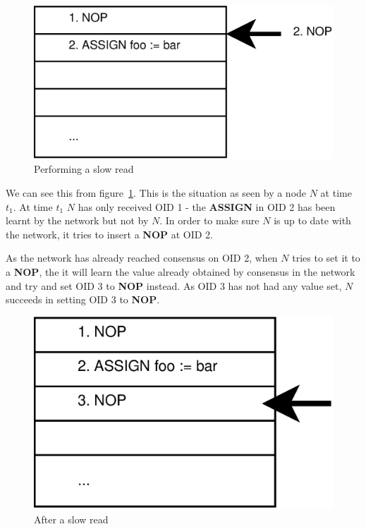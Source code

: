 \documentclass[12pt,twoside,notitlepage]{report}
\newcommand{\op}[1]  {{\bf #1}}         %
\begin{document}
\begin{figure}[htb]
\centering
\includegraphics[scale=0.5]{figs/op-log-slow-read-1.eps}
\caption{\label{fig:op-log-slow-read-1}Performing a slow read}
\end{figure}

We can see this from figure~\ref{fig:op-log-slow-read-1}. This is the situation as seen by a node
$N$ at time $t_1$. At time $t_1$ $N$ has only received OID 1 - the \op{ASSIGN} in OID 2 has been
learnt by the network but not by $N$. In order to make sure $N$ is up to date with the network, it
tries to insert a \op{NOP} at OID 2.

As the network has already reached consensus on OID 2, when $N$ tries to set it to a \op{NOP}, the
it will learn the value already obtained by consensus in the network and try and set OID 3 to
\op{NOP} instead. As OID 3 has not had any value set, $N$ succeeds in setting OID 3 to \op{NOP}.

\begin{figure}[htb]
\centering
\includegraphics[scale=0.5]{figs/op-log-slow-read-2.eps}
\caption{\label{fig:op-log-slow-read-2}After a slow read}
\end{figure}
\end{document}
